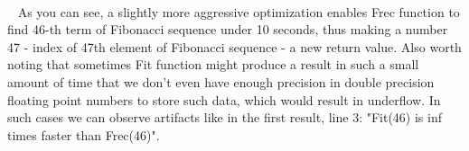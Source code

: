 \documentclass{article}
\begin{document}
	\paragraph{}\
	\rmfamily
	As you can see, a slightly more aggressive optimization enables Frec function to find 46-th term of Fibonacci sequence under 10 seconds, thus making a number 47 - index of 47th element of Fibonacci sequence - a new return value. Also worth noting that sometimes Fit function might produce a result in such a small amount of time that we don't even have enough precision in double precision floating point numbers to store such data, which would result in underflow. In such cases we can observe artifacts like in the first result, line 3: "Fit(46) is inf times faster than Frec(46)".
		
\end{document}
